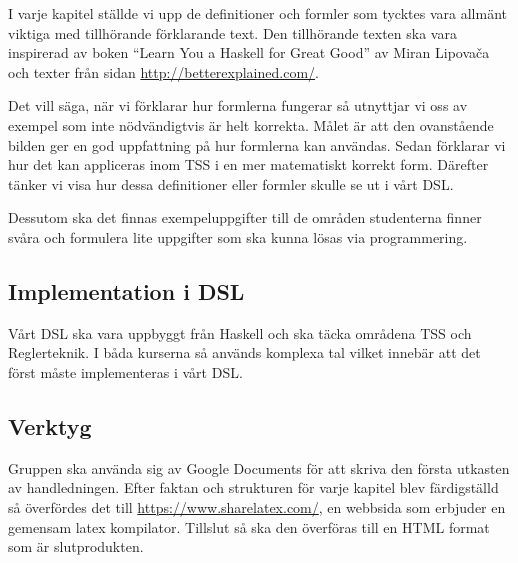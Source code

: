 \documentclass[]{article}
\begin{document}

I varje kapitel ställde vi upp de definitioner och formler som tycktes
vara allmänt viktiga med tillhörande förklarande text. Den tillhörande
texten ska vara inspirerad av boken ``Learn You a Haskell for Great
Good'' av Miran Lipovača \cite{learnyouahaskell} och texter från sidan
\url{http://betterexplained.com/}.

Det vill säga, när vi förklarar hur formlerna fungerar så utnyttjar vi
oss av exempel som inte nödvändigtvis är helt korrekta. Målet är
att den ovanstående bilden ger en god uppfattning på hur formlerna kan användas.
Sedan förklarar vi hur det kan appliceras inom TSS i en mer matematiskt korrekt form.
Därefter tänker vi visa hur dessa definitioner eller formler skulle se ut i vårt DSL.

Dessutom ska det finnas exempeluppgifter till de områden studenterna finner
svåra och formulera lite uppgifter som ska kunna lösas via programmering.

\subsection{Implementation i DSL}

Vårt DSL ska vara uppbyggt från Haskell och ska täcka områdena TSS och Reglerteknik.
I båda kurserna så används komplexa tal vilket innebär att det först måste implementeras i vårt DSL.

\subsection{Verktyg}%
Gruppen ska använda sig av Google Documents för att skriva den första utkasten av handledningen.
Efter faktan och strukturen för varje kapitel blev färdigställd så överfördes det till 
\url{https://www.sharelatex.com/}, en webbsida som erbjuder en gemensam latex kompilator. 
Tillslut så ska den överföras till en HTML format som är slutprodukten. 
\end{document}
